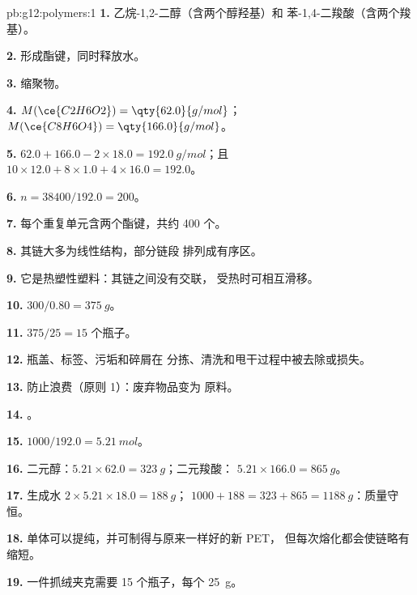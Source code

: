 \begin{solution}{pb:g12:polymers:1}
\textbf{1.} 乙烷-1,2-二醇（含两个醇羟基）和
苯-1,4-二羧酸（含两个羧基）。

\textbf{2.} 形成酯键，同时释放水。

\textbf{3.} 缩聚物。

\textbf{4.} $M(\ce{C2H6O2}) = \qty{62.0}{g/mol}$；$M(\ce{C8H6O4}) =
\qty{166.0}{g/mol}$。

\textbf{5.} $62.0 + 166.0 - 2 \times 18.0 = \qty{192.0}{g/mol}$；且
$10 \times 12.0 + 8 \times 1.0 + 4 \times 16.0 = 192.0$。

\textbf{6.} $n = 38400/192.0 = 200$。

\textbf{7.} 每个重复单元含两个酯键，共约 400 个。

\textbf{8.} 其链大多为线性结构，部分链段
排列成有序区。

\textbf{9.} 它是热塑性塑料：其链之间没有交联，
受热时可相互滑移。

\textbf{10.} $300/0.80 = \qty{375}{g}$。

\textbf{11.} $375/25 = 15$ 个瓶子。

\textbf{12.} 瓶盖、标签、污垢和碎屑在
分拣、清洗和甩干过程中被去除或损失。

\textbf{13.} 防止浪费（原则 1）：废弃物品变为
原料。

\textbf{14.} 。

\textbf{15.} $1000/192.0 = \qty{5.21}{mol}$。

\textbf{16.} 二元醇：$5.21 \times 62.0 = \qty{323}{g}$；二元羧酸：
$5.21 \times 166.0 = \qty{865}{g}$。

\textbf{17.} 生成水 $2 \times 5.21 \times 18.0 = \qty{188}{g}$；
$1000 + 188 = 323 + 865 = \qty{1188}{g}$：质量守恒。

\textbf{18.} 单体可以提纯，并可制得与原来一样好的新 PET，
但每次熔化都会使链略有缩短。

\textbf{19.} 一件抓绒夹克需要 15 个瓶子，每个 \qty{25}{g}。
\end{solution}
